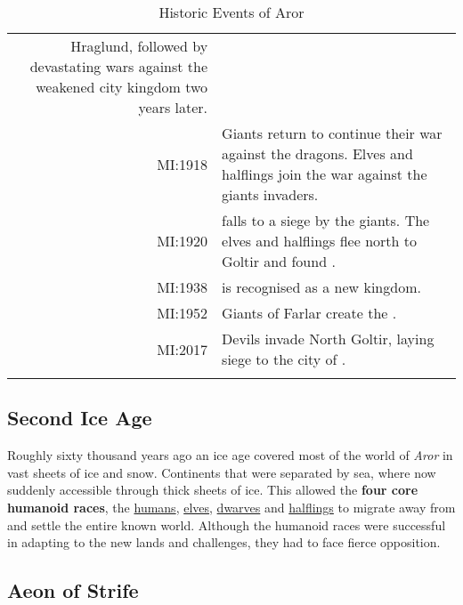 \begin{longtable}{@{\,}r <{\hskip 6pt} !{
  \color{LightSteelBlue3}
  \makebox[0pt]{\textbullet}
  \hskip -2.6pt
  \vrule width 1pt
  \hspace{\labelsep}
  }
  >{\raggedright\arraybackslash}p{11cm}
}
                       Hraglund, followed by devastating wars against the
                       weakened city kingdom two years later. \\
    MI:1918          & Giants return to continue their war against the dragons.
                       Elves and halflings join the war against the giants
                       invaders. \\
    MI:1920          &  falls to a siege by the giants.
                       The elves and halflings flee north to Goltir and found
                       . \\
    MI:1938          &  is recognised as a new kingdom. \\
    MI:1952          & Giants of Farlar create the . \\
    MI:2017          & Devils invade North Goltir, laying siege to the city
                       of . \\
  \caption{Historic Events of Aror}
\end{longtable}
\twocolumn
\clearpage

\subsection{Second Ice Age}
\label{sec:Second Ice Age}

Roughly sixty thousand years ago an ice age covered most of the world
of \emph{Aror} in vast sheets of ice and snow. Continents that were separated
by sea, where now suddenly accessible through thick sheets of ice. This
allowed the \textbf{four core humanoid races}, the
\hyperref[sec:Humans]{humans}, \hyperref[sec:Elves]{elves},
\hyperref[sec:Dwarves]{dwarves} and \hyperref[sec:Halflings]{halflings}
to migrate away from  and settle the entire known
world. Although the humanoid races were successful in adapting to the new
lands and challenges, they had to face fierce opposition.

\subsection{Aeon of Strife}
\label{sec:Aeon of Strife}

